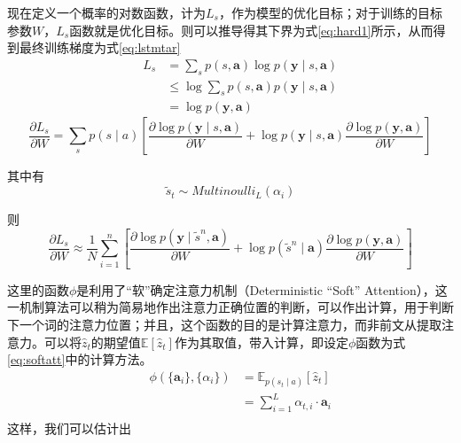 现在定义一个概率的对数函数，计为$L_s$，作为模型的优化目标；对于训练的目标参数$W$，$L_s$函数就是优化目标。则可以推导得其下界为式\eqref{eq:hard1}所示，从而得到最终训练梯度为式\eqref{eq:lstmtar}
\begin{equation}
    \begin{aligned}
        && L_s &= \sum_s p(s, \textbf{a}) \log p(\textbf{y}\mid {s }, \textbf{a} ) \\
        && & \le \log \sum_sp(s, \textbf{a}) p(\textbf{y}\mid {s }, \textbf{a} ) \\
        && & = \log p(\textbf{y}, \textbf{a})
    \end{aligned}
    \label{eq:hard1}
\end{equation}
\begin{equation}
    \frac{\partial L_s}{\partial W} = \sum_s p(s \mid a) [\frac{\partial \log p(\textbf{y}\mid {s }, \textbf{a} )}{\partial W} + \log p(\textbf{y}\mid {s }, \textbf{a} ) \frac{\partial \log p(\textbf{y}, \textbf{a})}{\partial W} ]
    \label{eq:lstmtar}
\end{equation}

其中有
\begin{equation}
    \tilde{s}_t \sim Multinoulli_L({\alpha_i})
\end{equation}

则
\begin{equation}
    \frac{\partial L_s}{\partial W} \approx \frac{1}{N} \sum_{i=1}^{n} [\frac{\partial \log p(\textbf{y}\mid \tilde{s}^n, \textbf{a} )}{\partial W} + \log p(\tilde{s}^n \mid \textbf{a} ) \frac{\partial \log p(\textbf{y}, \textbf{a})}{\partial W} ]
    \label{eq:lstmtar}
\end{equation}

这里的函数$\phi$是利用了“软”确定注意力机制（Deterministic “Soft” Attention），这一机制算法可以稍为简易地作出注意力正确位置的判断，可以作出计算，用于判断下一个词的注意力位置；并且，这个函数的目的是计算注意力，而非前文从提取注意力。可以将$\hat{z}_t$的期望值$\mathbb{E} [\hat{z}_t]$作为其取值，带入计算，即设定$\phi$函数为式\eqref{eq:softatt}中的计算方法。
\begin{equation}
    \begin{aligned}
        &&\phi(\{\textbf{a}_i\},\{\alpha_i\})&= \mathbb{E}_{p(s_t\mid a)} [\hat{z}_t] \\
        && & =\sum_{i=1}^L \alpha_{t,i} \cdot \textbf{a}_i \\
    \end{aligned}
    \label{eq:softatt}
\end{equation}
这样，我们可以估计出


